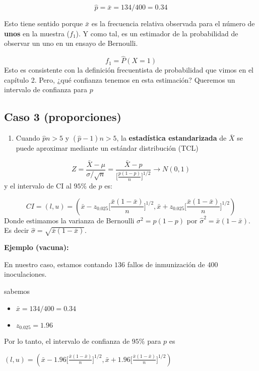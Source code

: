 \documentclass[
]{book}
\providecommand{\tightlist}{%
  \setlength{\itemsep}{0pt}\setlength{\parskip}{0pt}}
\begin{document}
\[\hat{p}=\bar{x}=134/400=0.34\]

Esto tiene sentido porque \(\bar{x}\) es la frecuencia relativa observada para el número de \textbf{unos} en la muestra (\(f_1\)). Y como tal, es un estimador de la probabilidad de observar un uno en un ensayo de Bernoulli.

\[f_1 =\hat{P}(X=1)\]
Esto es consistente con la definición frecuentista de probabilidad que vimos en el capítulo 2. Pero, ¿qué confianza tenemos en esta estimación? Queremos un intervalo de confianza para \(p\)

\hypertarget{caso-3-proporciones}{%
\subsection{Caso 3 (proporciones)}\label{caso-3-proporciones}}

\begin{enumerate}
\def\labelenumi{\arabic{enumi}.}
\tightlist
\item
  Cuando \(\hat{p}n>5\) y \((\hat{p}-1)n>5\), la \textbf{estadística estandarizada} de \(\bar{X}\) se puede aproximar mediante un estándar distribución (TCL)
\end{enumerate}

\[Z=\frac{\bar{X}-\mu}{\sigma/\sqrt{n}}= \frac{\bar{X}-p}{\big[\frac{p(1-p)}{n} \big]^{1/2}}\rightarrow N(0,1)\]
y el intervalo de CI al \(95\%\) de \(p\) es:

\[CI=(l,u)=(\bar{x}-z_{0.025}\big[\frac{\bar{x}(1-\bar{x})}{n} \big]^{ 1/2}, \bar{x}+z_{0.025}\big[\frac{\bar{x}(1-\bar{x})}{n} \big]^{1/2})\]
Donde estimamos la varianza de Bernoulli \(\sigma^2=p(1-p)\) por \(\hat{\sigma}^2=\bar{x}(1-\bar{x})\). Es decir \(\hat{\sigma}=\sqrt{\bar{x}(1-\bar{x})}\).

\textbf{Ejemplo (vacuna):}

En nuestro caso, estamos contando \(136\) fallos de inmunización de \(400\) inoculaciones.

sabemos

\begin{itemize}
\tightlist
\item
  \(\bar{x}=134/400=0.34\)
\item
  \(z_{0.025}=1.96\)
\end{itemize}

Por lo tanto, el intervalo de confianza de \(95\%\) para \(p\) es

\((l,u)=(\bar{x}-1.96 \big[\frac{\bar{x}(1-\bar{x})}{n} \big]^{1/2}, \bar{x}+1.96 \big[\frac{\bar{x}(1-\bar{x})}{n} \big]^{1/2})\)
\end{document}
